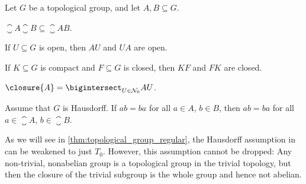 \documentclass[article, a4paper, 11pt, oneside]{memoir}
\numberwithin{equation}{chapter}
\begin{document}
\begin{proposition}
    Let $G$ be a topological group, and let $A, B \subseteq G$.
    \begin{enumprop}
        \item \label{enum:closure_of_product} $\closure{A} \closure{B} \subseteq \closure{AB}$.

        \item \label{enum:product_open_set} If $U \subseteq G$ is open, then $AU$ and $UA$ are open.

        \item \label{enum:product-compact-closed} If $K \subseteq G$ is compact and $F \subseteq G$ is closed, then $KF$ and $FK$ are closed.

        \item \label{enum:closure-intersection-of-open-sets} $\closure{A} = \bigintersect_{U \in \nhoodfilter{0}} AU$.
        
        \item \label{enum:elements-of-closure-commute} Assume that $G$ is Hausdorff. If $ab = ba$ for all $a \in A$, $b \in B$, then $ab = ba$ for all $a \in \closure{A}$, $b \in \closure{B}$.
    \end{enumprop}
\end{proposition}
%
As we will see in \cref{thm:topological_group_regular}, the Hausdorff assumption in  can be weakened to just $T_0$. However, this assumption cannot be dropped: Any non-trivial, nonabelian group is a topological group in the trivial topology, but then the closure of the trivial subgroup is the whole group and hence not abelian.
\end{document}

